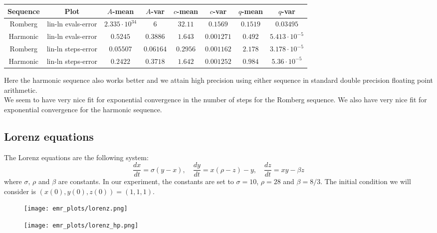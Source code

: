 \begin{table}[H]
    \centering
    \small
     \begin{tabular}{c|c||c|c|c|c|c|c}
Sequence & Plot & \(A\)-mean & \(A\)-var & \(c\)-mean & \(c\)-var & \(q\)-mean & \(q\)-var\\\hline
Romberg & lin-ln evals-error & \(2.335\cdot 10^{34}\) & \(6\) & \(32.11\) & \(0.1569\) & \(0.1519\) & \(0.03495\) \\
Harmonic & lin-ln evals-error & \(0.5245\) & \(0.3886\) & \(1.643\) & \(0.001271\) & \(0.492\) & \(5.413\cdot 10^{-5}\) \\
Romberg & lin-ln steps-error & \(0.05507\) & \(0.06164\) & \(0.2956\) & \(0.001162\) & \(2.178\) & \(3.178\cdot 10^{-5}\) \\
Harmonic & lin-ln steps-error & \(0.2422\) & \(0.3718\) & \(1.642\) & \(0.001252\) & \(0.984\) & \(5.36\cdot 10^{-5}\) \\
    \end{tabular}
    \label{tab:my_label}
\end{table}

Here the harmonic sequence also works better and we attain high precision using either sequence in standard double precision floating point arithmetic.\\

We seem to have very nice fit for exponential convergence in the number of steps for the Romberg sequence. We also have very nice fit for exponential convergence for the harmonic sequence.

\subsection{Lorenz equations}

The Lorenz equations are the following system: 
\[
\frac{dx}{dt} = \sigma (y-x),\quad \frac{dy}{dt} = x(\rho - z) - y,\quad \frac{dz}{dt} = xy - \beta z
\]
where \(\sigma,\,\rho\) and \(\beta\) are constants. In our experiment, the constants are set to \(\sigma = 10\), \(\rho = 28\) and \(\beta = 8/3\). The initial condition we will consider is \((x(0),y(0),z(0)) = (1,1,1)\).\\

\begin{figure}[H]
\centering
\begin{minipage}{0.45\textwidth}
\centering
\texttt{[image: emr\_plots/lorenz.png]}
\end{minipage}
\begin{minipage}{0.45\textwidth}
\centering
\texttt{[image: emr\_plots/lorenz\_hp.png]}
\end{minipage}
\end{figure}

